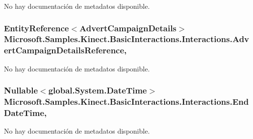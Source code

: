 No hay documentación de metadatos disponible. 

\hypertarget{class_microsoft_1_1_samples_1_1_kinect_1_1_basic_interactions_1_1_interactions_af3311a9cd64d2724cfde117072ea9be0}{
\subsubsection[{Advert\-Campaign\-Details\-Reference}]{\setlength{\rightskip}{0pt plus 5cm}Entity\-Reference$<${\bf Advert\-Campaign\-Details}$>$ Microsoft.\-Samples.\-Kinect.\-Basic\-Interactions.\-Interactions.\-Advert\-Campaign\-Details\-Reference\hspace{0.3cm}{\ttfamily [get]}, {\ttfamily [set]}}}\label{class_microsoft_1_1_samples_1_1_kinect_1_1_basic_interactions_1_1_interactions_af3311a9cd64d2724cfde117072ea9be0}


No hay documentación de metadatos disponible. 

\hypertarget{class_microsoft_1_1_samples_1_1_kinect_1_1_basic_interactions_1_1_interactions_a86e2940cfbdd262bbb5d2c5622322b05}{
\subsubsection[{End\-Date\-Time}]{\setlength{\rightskip}{0pt plus 5cm}Nullable$<$global.\-System.\-Date\-Time$>$ Microsoft.\-Samples.\-Kinect.\-Basic\-Interactions.\-Interactions.\-End\-Date\-Time\hspace{0.3cm}{\ttfamily [get]}, {\ttfamily [set]}}}\label{class_microsoft_1_1_samples_1_1_kinect_1_1_basic_interactions_1_1_interactions_a86e2940cfbdd262bbb5d2c5622322b05}


No hay documentación de metadatos disponible. 

